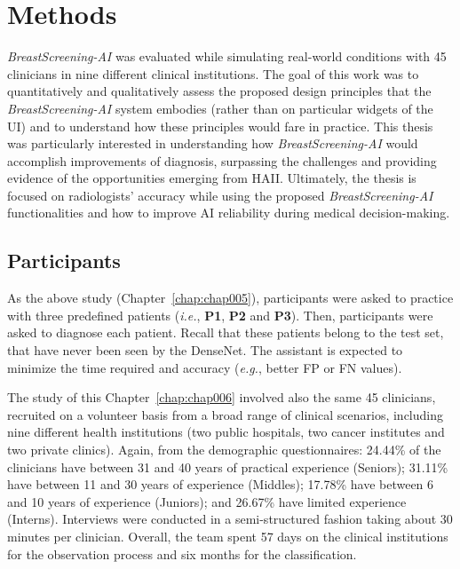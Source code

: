 \section{Methods}
\label{sec:app002005}

{\it BreastScreening-AI} was evaluated while simulating real-world conditions with 45 clinicians in nine different clinical institutions.
The goal of this work was to quantitatively and qualitatively assess the proposed design principles that the {\it BreastScreening-AI} system embodies (rather than on particular widgets of the \ac{UI}) and to understand how these principles would fare in practice.
This thesis was particularly interested in understanding how {\it BreastScreening-AI} would accomplish improvements of diagnosis, surpassing the challenges and providing evidence of the opportunities emerging from \ac{HAII}.
Ultimately, the thesis is focused on radiologists' accuracy while using the proposed {\it BreastScreening-AI} functionalities and how to improve \ac{AI} reliability during medical decision-making.

\subsection{Participants}
\label{sec:app002005001}

As the above study (Chapter~\ref{chap:chap005}), participants were asked to practice with three predefined patients ({\it i.e.}, {\bf P1}, {\bf P2} and {\bf P3}).
Then, participants were asked to diagnose each patient.
Recall that these patients belong to the test set, that have never been seen by the DenseNet.
The assistant is expected to minimize the time required and accuracy ({\it e.g.}, better \ac{FP} or \ac{FN} values).

The study of this Chapter~\ref{chap:chap006} involved also the same 45 clinicians, recruited on a volunteer basis from a broad range of clinical scenarios, including nine different health institutions (two public hospitals, two cancer institutes and two private clinics).
Again, from the demographic questionnaires:
24.44\% of the clinicians have between 31 and 40 years of practical experience (Seniors);
31.11\% have between 11 and 30 years of experience (Middles);
17.78\% have between 6 and 10 years of experience (Juniors); and
26.67\% have limited experience (Interns).
Interviews were conducted in a semi-structured fashion taking about 30 minutes per clinician.
Overall, the team spent 57 days on the clinical institutions for the observation process and six months for the classification.

